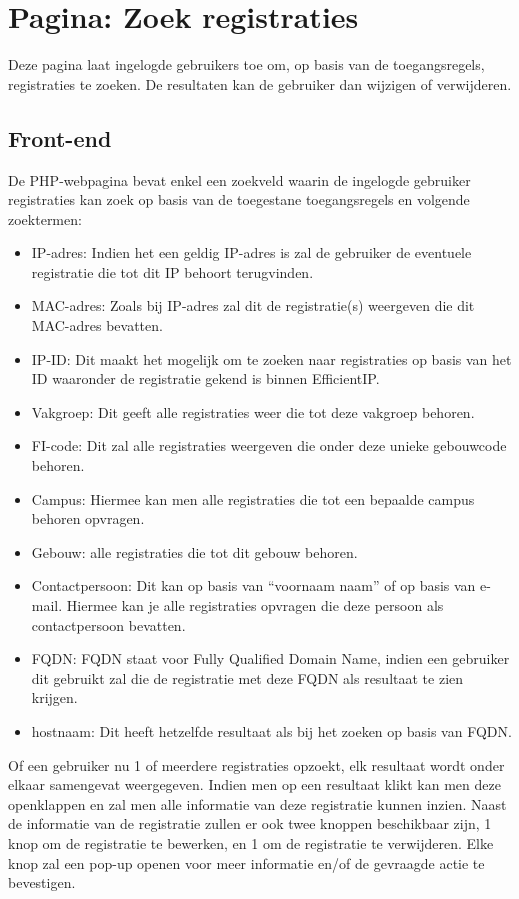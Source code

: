 \section{Pagina: Zoek registraties}
\label{zoek-registraties}
Deze pagina laat ingelogde gebruikers toe om, op basis van de toegangsregels, registraties te zoeken. De resultaten kan de gebruiker dan wijzigen of verwijderen.
\subsection{Front-end}
De PHP-webpagina bevat enkel een zoekveld waarin de ingelogde gebruiker registraties kan zoek op basis van de toegestane toegangsregels en volgende zoektermen:
\begin{itemize}
    \item IP-adres: Indien het een geldig IP-adres is zal de gebruiker de eventuele registratie die tot dit IP behoort terugvinden.
    \item MAC-adres: Zoals bij IP-adres zal dit de registratie(s) weergeven die dit MAC-adres bevatten.
    \item IP-ID: Dit maakt het mogelijk om te zoeken naar registraties op basis van het ID waaronder de registratie gekend is binnen EfficientIP.
    \item Vakgroep: Dit geeft alle registraties weer die tot deze vakgroep behoren.
    \item FI-code: Dit zal alle registraties weergeven die onder deze unieke gebouwcode behoren.
    \item Campus: Hiermee kan men alle registraties die tot een bepaalde campus behoren opvragen.
    \item Gebouw: alle registraties die tot dit gebouw behoren.
    \item Contactpersoon: Dit kan op basis van “voornaam naam” of op basis van e-mail. Hiermee kan je alle registraties opvragen die deze persoon als contactpersoon bevatten.
    \item FQDN: FQDN staat voor Fully Qualified Domain Name, indien een gebruiker dit gebruikt zal die de registratie met deze FQDN als resultaat te zien krijgen.
    \item hostnaam: Dit heeft hetzelfde resultaat als bij het zoeken op basis van FQDN.
\end{itemize}
Of een gebruiker nu 1 of meerdere registraties opzoekt, elk resultaat wordt onder elkaar samengevat weergegeven. Indien men op een resultaat klikt kan men deze openklappen en zal men alle informatie van deze registratie kunnen inzien. Naast de informatie van de registratie zullen er ook twee knoppen beschikbaar zijn, 1 knop om de registratie te bewerken, en 1 om de registratie te verwijderen.
Elke knop zal een pop-up openen voor meer informatie en/of de gevraagde actie te bevestigen.

